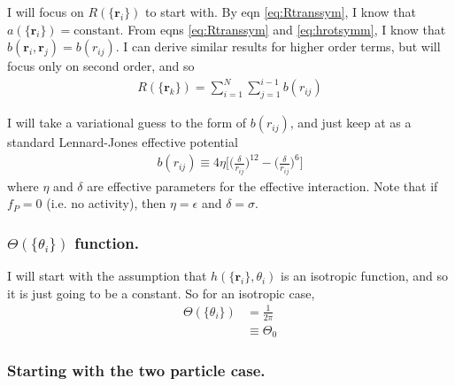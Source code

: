 \documentclass{article}
\begin{document}
I will focus on $R(\{\bm{r}_i\})$ to start with. By eqn \ref{eq:Rtranssym}, I know that
$a(\{\bm{r}_i\})=\mathrm{constant}$. From eqns \ref{eq:Rtranssym} and \ref{eq:hrotsymm}, I know
that $b(\bm{r}_i,\bm{r}_j)=b(r_{ij})$. I can derive similar results for higher order
terms, but will focus only on second order, and so
\begin{align}
  R(\{\bm{r}_k\})= \sum_{i=1}^N\sum_{j=1}^{i-1}b(r_{ij})
\end{align}

I will take a variational guess to the form of $b(r_{ij})$, and just keep at as a standard
Lennard-Jones effective potential
\begin{align}
  b(r_{ij})\equiv 4\eta\bigg[\bigg(\frac{\delta}{r_{ij}}\bigg)^{12}-
  \bigg(\frac{\delta}{r_{ij}}\bigg)^6\bigg]
\end{align}
where $\eta$ and $\delta$ are effective parameters for the effective interaction. Note that if
$f_P=0$ (i.e. no activity), then $\eta=\epsilon$ and $\delta=\sigma$.

\subsubsection{$\Theta(\{\theta_i\})$ function.}

I will start with the assumption that $h(\{\bm{r}_i\},\theta_i)$ is an isotropic function, and so
it is just going to be a constant. So for an isotropic case,
\begin{align}
  \Theta(\{\theta_i\})&=\frac{1}{2\pi}\nonumber\\
                      &\equiv\Theta_0
\end{align}

\subsubsection{Starting with the two particle case.}
\end{document}
